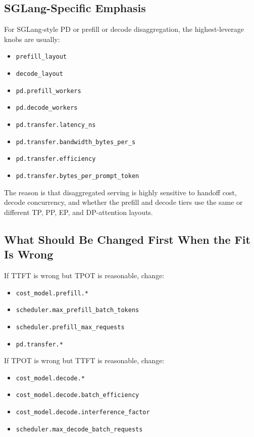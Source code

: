 \subsection{SGLang-Specific Emphasis}

For SGLang-style PD or prefill or decode disaggregation, the highest-leverage
knobs are usually:

\begin{itemize}
\item \texttt{prefill\_layout}
\item \texttt{decode\_layout}
\item \texttt{pd.prefill\_workers}
\item \texttt{pd.decode\_workers}
\item \texttt{pd.transfer.latency\_ns}
\item \texttt{pd.transfer.bandwidth\_bytes\_per\_s}
\item \texttt{pd.transfer.efficiency}
\item \texttt{pd.transfer.bytes\_per\_prompt\_token}
\end{itemize}

The reason is that disaggregated serving is highly sensitive to handoff cost,
decode concurrency, and whether the prefill and decode tiers use the same or
different TP, PP, EP, and DP-attention layouts.

\subsection{What Should Be Changed First When the Fit Is Wrong}

If TTFT is wrong but TPOT is reasonable, change:

\begin{itemize}
\item \texttt{cost\_model.prefill.*}
\item \texttt{scheduler.max\_prefill\_batch\_tokens}
\item \texttt{scheduler.prefill\_max\_requests}
\item \texttt{pd.transfer.*}
\end{itemize}

If TPOT is wrong but TTFT is reasonable, change:

\begin{itemize}
\item \texttt{cost\_model.decode.*}
\item \texttt{cost\_model.decode.batch\_efficiency}
\item \texttt{cost\_model.decode.interference\_factor}
\item \texttt{scheduler.max\_decode\_batch\_requests}
\end{itemize}

